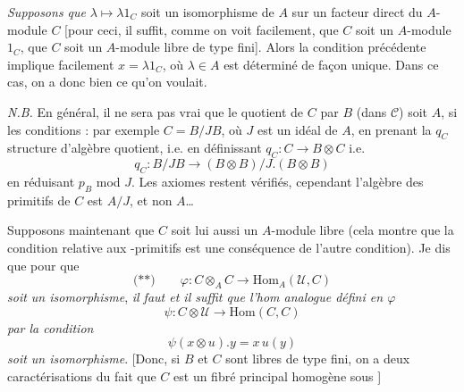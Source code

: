 \documentclass[11pt,a4paper]{article}
\begin{document}
\emph{Supposons que} $\lambda \mapsto \lambda 1_C$ soit un isomorphisme de
$A$ sur un facteur direct du $A$-module $C$ [pour ceci, il suffit, comme on
voit facilement, que $C$ soit un $A$-module 
\ill{}  $1_C$,  que
$C$ soit un $A$-module libre de type fini]. Alors la condition précédente
implique facilement $x = \lambda 1_C$, où $\lambda \in A$ est déterminé de
façon unique. Dans ce cas, on a donc bien ce qu'on voulait.

\emph{N.B.} En général, \struck{\ill{}} il ne sera pas vrai que le quotient
de $C$ par $B$ (dans $\mathcal{C}$) soit $A$, si les conditions \ill{}
 : par exemple  $C = B/JB$, où
$J$ est un idéal de $A$, \struck{\ill{}}  en prenant
la $q_C$ structure d'algèbre quotient, i.e. en définissant
$q_C : C \to B \otimes C$ i.e.
\[
q_C : B/JB \longrightarrow (B \otimes B)/J.(B \otimes B)
\]
en réduisant $p_B$ mod $J$. Les axiomes restent vérifiés, cependant
l'algèbre des primitifs de $C$ est $A/J$, et non $A$\ldots


Supposons maintenant que $C$ soit lui aussi un $A$-module libre (cela
montre que la condition relative aux -primitifs est une
conséquence de l'autre condition). Je dis que pour que \struck{$\varphi$}
\[
\text{(**)} \qquad \varphi : C \otimes_A C \longrightarrow \mathrm{Hom}_A(\mathcal{U}, C)
\]
\emph{soit un isomorphisme}, \emph{il faut et il suffit que l'hom
analogue défini en $\varphi$}
\[
\psi : C \otimes \mathcal{U} \longrightarrow \mathrm{Hom}(C, C)
\]
\emph{par la condition}
\[
\boxed{\ \psi(x \otimes u) . y = x\, u(y)\ }
\]
\emph{soit un isomorphisme}.
[Donc, si $B$ et $C$ sont libres de type fini, on a deux caractérisations
  du fait que
$C$ est un fibré principal homogène sous ]
\end{document}
